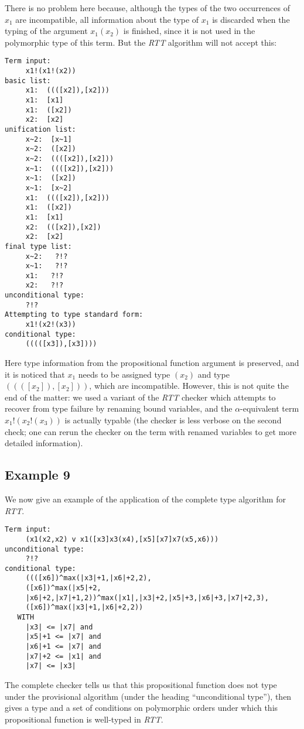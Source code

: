 \documentclass{article}
\begin{document}
There is no problem here because, although the types of the two
occurrences of $x_1$ are incompatible, all information about the type
of $x_1$ is discarded when the typing of the argument $x_1(x_2)$ is
finished, since it is not used in the polymorphic type of this term.
But the {\em RTT\/} algorithm will not accept this:

\begin{verbatim}
Term input:
     x1!(x1!(x2))
basic list:
     x1:  ((([x2]),[x2]))
     x1:  [x1]
     x1:  ([x2])
     x2:  [x2]
unification list:
     x~2:  [x~1]
     x~2:  ([x2])
     x~2:  ((([x2]),[x2]))
     x~1:  ((([x2]),[x2]))
     x~1:  ([x2])
     x~1:  [x~2]
     x1:  ((([x2]),[x2]))
     x1:  ([x2])
     x1:  [x1]
     x2:  (([x2]),[x2])
     x2:  [x2]
final type list:
     x~2:   ?!? 
     x~1:   ?!? 
     x1:   ?!? 
     x2:   ?!? 
unconditional type:
     ?!? 
Attempting to type standard form:
     x1!(x2!(x3))
conditional type:
     (((([x3]),[x3])))
\end{verbatim}

Here type information from the propositional function argument is
preserved, and it is noticed that $x_1$ needs to be assigned type
$(x_2)$ and type $((([x_2]),[x_2]))$, which are incompatible.
However, this is not quite the end of the matter: we used a variant of
the {\em RTT\/} checker which attempts to recover from type failure by
renaming bound variables, and the $\alpha$-equivalent term
$x_1!(x_2!(x_3))$ is actually typable (the checker is less verbose on
the second check; one can rerun the checker on the term with renamed
variables to get more detailed information).
\subsection{Example 9}
We now give an example of the application of the complete type
algorithm for {\em RTT\/}.

\begin{verbatim}
Term input:
     (x1(x2,x2) v x1([x3]x3(x4),[x5][x7]x7(x5,x6)))
unconditional type:
     ?!? 
conditional type:
     ((([x6])^max(|x3|+1,|x6|+2,2),
     ([x6])^max(|x5|+2,
     |x6|+2,|x7|+1,2))^max(|x1|,|x3|+2,|x5|+3,|x6|+3,|x7|+2,3),
     ([x6])^max(|x3|+1,|x6|+2,2))
   WITH
     |x3| <= |x7| and
     |x5|+1 <= |x7| and
     |x6|+1 <= |x7| and
     |x7|+2 <= |x1| and
     |x7| <= |x3|
\end{verbatim}

The complete checker tells us that this propositional function does
not type under the provisional algorithm (under the heading
``unconditional type''), then gives a type and a set of conditions on
polymorphic orders under which this propositional function is
well-typed in {\em RTT\/}.
\end{document}
